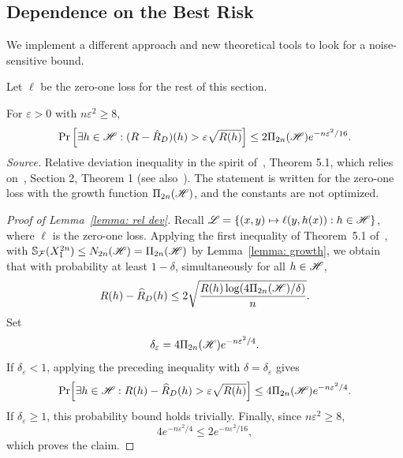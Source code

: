 \documentclass[reqno]{amsart}
\begin{document}
\subsection{Dependence on the Best Risk}
We implement a different approach and new theoretical tools to look for a noise-sensitive bound. 

Let $\ell$ be the zero-one loss for the rest of this section.

\begin{lemma}\label{lemma: rel dev}
  For $\varepsilon>0$ with $n\varepsilon^2 \ge 8$,
  \[
  \Pr\left[\exists h\in\mathscr{H} : (R-\hat R_D)(h) > \varepsilon\sqrt{R(h)}\right] \le 2\Pi_{2n}(\mathscr{H})e^{-n\varepsilon^2/16}.
  \]
\textnormal{\emph{Source.} Relative deviation inequality in the spirit of~\cite{boucheron2005theory}, Theorem 5.1, which relies on~\cite{bartlett1999inequality}, Section 2, Theorem 1 (see also~\cite{anthony1993result}). The statement is written for the zero-one loss with the growth function $\Pi_{2n}(\mathscr{H})$, and the constants are not optimized.}

\begin{proof}[Proof of Lemma~\ref{lemma: rel dev}]
Recall $\mathscr{L}=\{(x,y)\mapsto\ell(y,h(x)):h\in\mathscr{H}\}$,
where $\ell$ is the zero-one loss. Applying the first inequality of Theorem~5.1
of~\cite{boucheron2005theory}, with $\mathbb{S}_\mathcal{F}(X_1^{2n}) \le N_{2n}(\mathscr{H}) = \Pi_{2n}(\mathscr{H})$ by Lemma~\ref{lemma: growth}, we obtain that with probability at least $1-\delta$, simultaneously for all
$h\in\mathscr{H}$,
\[
R(h)-\widehat R_D(h)
\le
2\sqrt{\frac{R(h)\log(4\Pi_{2n}(\mathscr{H})/\delta)}{n}}.
\]
Set
\[
\delta_\varepsilon
=
4\Pi_{2n}(\mathscr{H})e^{-n\varepsilon^2/4}.
\]
If $\delta_\varepsilon<1$, applying the preceding inequality
with $\delta=\delta_\varepsilon$ gives
\[
\Pr\!\left[
\exists h\in\mathscr{H}:
R(h)-\widehat R_D(h)>\varepsilon\sqrt{R(h)}
\right]
\le
4\Pi_{2n}(\mathscr{H})e^{-n\varepsilon^2/4}.
\]
If $\delta_\varepsilon\ge1$, this probability bound holds
trivially. Finally, since $n\varepsilon^2\ge8$,
\[
4e^{-n\varepsilon^2/4}
\le
2e^{-n\varepsilon^2/16},
\]
which proves the claim.
\end{proof}
\end{lemma}
\end{document}
